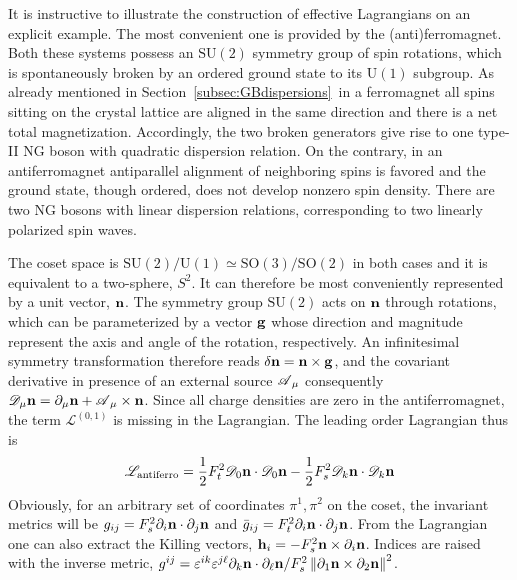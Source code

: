 \documentclass[final,2p,times,12pt,sort&compress]{elsarticle}
\newcommand\gr[1]{\mathrm{#1}}              %
\newcommand\Lag{\mathscr{L}}                %
\newcommand\DD{\mathscr{D}}                 %
\newcommand\AAA{\mathscr{A}}                %
\newcommand\vek[1]{{\boldsymbol{\bf #1}}}   %
\newcommand\de{\partial}
\newcommand\ve{\varepsilon}
\newcommand\nor[1]{\left\|#1\right\|}       %
\begin{document}
It is instructive to illustrate the construction of effective Lagrangians on an
explicit example. The most convenient one is provided by the (anti)ferromagnet.
Both these systems possess an $\gr{SU(2)}$ symmetry group of spin rotations,
which is spontaneously broken by an ordered ground state to its $\gr{U(1)}$
subgroup. As already mentioned in Section~\ref{subsec:GBdispersions}\ in a
ferromagnet all spins sitting on the crystal lattice are aligned in the same
direction and there is a net total magnetization. Accordingly, the two broken
generators give rise to one type-II NG boson with quadratic dispersion
relation. On the contrary, in an antiferromagnet antiparallel alignment of
neighboring spins is favored and the ground state, though ordered, does not
develop nonzero spin density. There are two NG bosons with linear dispersion
relations, corresponding to two linearly polarized spin waves.

The coset space is $\gr{SU(2)/U(1)\simeq SO(3)/SO(2)}$ in both cases and it is
equivalent to a two-sphere, $S^2$. It can therefore be most conveniently
represented by a unit vector, $\vek n$. The symmetry group $\gr{SU(2)}$ acts on
$\vek n$ through rotations, which can be parameterized by a vector $\vek g$
whose direction and magnitude represent the axis and angle of the rotation,
respectively. An infinitesimal symmetry transformation therefore reads
$\delta\vek n=\vek n\times\vek g$, and the covariant derivative in presence of
an external source $\vek\AAA_\mu$ consequently $\DD_\mu\vek n=\de_\mu\vek n+
\vek\AAA_\mu\times\vek n$. Since all charge densities are zero in the
antiferromagnet, the term $\Lag^{(0,1)}$ is missing in the Lagrangian. The
leading order Lagrangian thus is
\begin{equation}
\Lag_{\text{antiferro}}=\frac12F_t^2\DD_0\vek n\cdot\DD_0\vek n
-\frac12F_s^2\DD_k\vek n\cdot\DD_k\vek n
\end{equation}
Obviously, for an arbitrary set of coordinates $\pi^1,\pi^2$ on the coset, the
invariant metrics will be $g_{ij}=F_s^2\de_i\vek n\cdot\de_j\vek n$ and
$\bar g_{ij}=F_t^2\de_i\vek n\cdot\de_j\vek n$. From the Lagrangian one can
also extract the Killing vectors, $\vek h_i=-F_s^2\vek n\times\de_i\vek n$.
Indices are raised with the inverse metric,
$g^{ij}=\ve^{ik}\ve^{j\ell}\de_k\vek n\cdot\de_\ell\vek n/F_s^2\nor{\de_1\vek
n\times\de_2\vek n}^2$.
\end{document}
